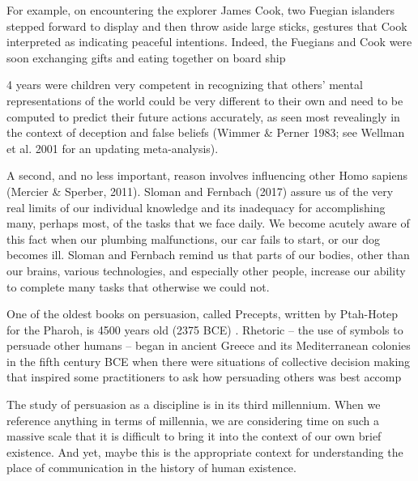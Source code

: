 \documentclass{article} %
\begin{document}
For example, on encountering the explorer
James Cook, two Fuegian islanders stepped forward to
display and then throw aside large sticks, gestures that
Cook interpreted as indicating peaceful intentions. Indeed,
the Fuegians and Cook were soon exchanging gifts and
eating together on board ship



4 years were children very competent in recognizing that others’ mental representations of the world could be very different to their own and need to be computed to predict their future actions accurately, as seen most revealingly in the context of deception and false beliefs (Wimmer & Perner 1983; see Wellman et al. 2001 for an updating meta-analysis).

A second, and no less important, reason involves influencing other Homo
sapiens (Mercier & Sperber, 2011). Sloman and Fernbach (2017) assure us
of the very real limits of our individual knowledge and its inadequacy for
accomplishing many, perhaps most, of the tasks that we face daily. We become
acutely aware of this fact when our plumbing malfunctions, our car fails to
start, or our dog becomes ill. Sloman and Fernbach remind us that parts
of our bodies, other than our brains, various technologies, and especially
other people, increase our ability to complete many tasks that otherwise we
could not.




One of the oldest books on persuasion, called Precepts, written by Ptah-Hotep for the Pharoh, is 4500 years old (2375 BCE) \cite{XXX}. 
Rhetoric  – the use of symbols to persuade
other humans – began in ancient Greece and its Mediterranean colonies in the fifth century
BCE when there were situations of collective decision making that inspired some practitioners
to ask how persuading others was best accomp

The study of persuasion as a discipline is in its third millennium. When we reference anything in terms of millennia, we are considering time on such a massive scale that it is difficult to bring it into the context of our own brief existence. And yet, maybe this is the appropriate context for understanding the place of communication in the history of human existence. 
\end{document}
